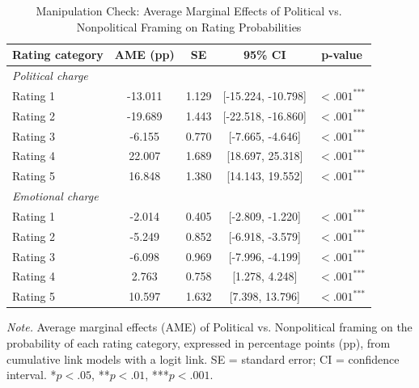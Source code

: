\begin{table}[H]
\centering
\caption{Manipulation Check: Average Marginal Effects of Political vs. Nonpolitical Framing on Rating Probabilities}
\label{tab:manip_check_ame}
\begingroup
\footnotesize
\renewcommand{\arraystretch}{0.90}

\begin{tabularx}{\linewidth}{Xcccc}
\toprule
\textbf{Rating category} & \textbf{AME (pp)} & \textbf{SE} & \textbf{95\% CI} & \textbf{p-value} \\
\midrule
\multicolumn{5}{l}{\textit{Political charge}} \\
Rating 1 & -13.011 & 1.129 & [-15.224, -10.798] & $< .001^{\text{***}}$ \\
Rating 2 & -19.689 & 1.443 & [-22.518, -16.860] & $< .001^{\text{***}}$ \\
Rating 3 & -6.155 & 0.770 & [-7.665, -4.646] & $< .001^{\text{***}}$ \\
Rating 4 & 22.007 & 1.689 & [18.697, 25.318] & $< .001^{\text{***}}$ \\
Rating 5 & 16.848 & 1.380 & [14.143, 19.552] & $< .001^{\text{***}}$ \\
\multicolumn{5}{l}{\textit{Emotional charge}} \\
Rating 1 & -2.014 & 0.405 & [-2.809, -1.220] & $< .001^{\text{***}}$ \\
Rating 2 & -5.249 & 0.852 & [-6.918, -3.579] & $< .001^{\text{***}}$ \\
Rating 3 & -6.098 & 0.969 & [-7.996, -4.199] & $< .001^{\text{***}}$ \\
Rating 4 & 2.763 & 0.758 & [1.278, 4.248] & $< .001^{\text{***}}$ \\
Rating 5 & 10.597 & 1.632 & [7.398, 13.796] & $< .001^{\text{***}}$ \\
\bottomrule
\end{tabularx}

\vspace{0.6em}
{\footnotesize
\setlength{\baselineskip}{12pt}
\textit{Note.} Average marginal effects (AME) of Political vs. Nonpolitical framing on the probability of each rating category, expressed in percentage points (pp), from cumulative link models with a logit link. SE = standard error; CI = confidence interval. *$p < .05$, **$p < .01$, ***$p < .001$.
\par}
\endgroup
\end{table}
